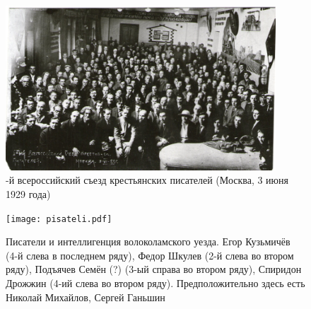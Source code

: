 \begin{figure}
  \centering
  \includegraphics[width=0.9\textwidth]{syezd.pdf}
  \caption*{-й всероссийский съезд крестьянских писателей (Москва, 3 июня 1929 года)}
\end{figure}

\begin{figure}
  \centering
  \texttt{[image: pisateli.pdf]}
  \caption*{Писатели и интеллигенция волоколамского уезда. Егор Кузьмичёв (4-й слева в последнем ряду), Федор Шкулев (2-й слева во втором ряду), Подъячев Семён (?) (3-ый справа во втором ряду), Спиридон Дрожжин (4-ий слева во втором ряду). Предположительно здесь есть Николай Михайлов, Сергей Ганьшин}
\end{figure}
